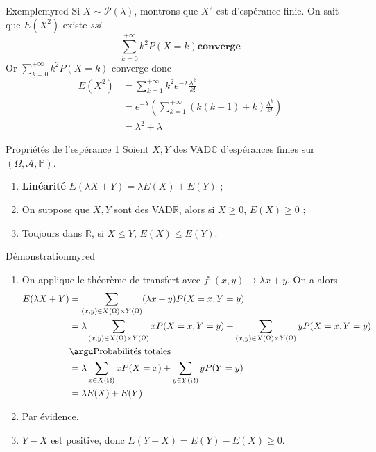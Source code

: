     \begin{omed}{Exemple}{myred}
        Si $X \sim \mathcal{P}(\lambda)$, montrons que $X^2$ est d’espérance finie. On sait que $E(X^2)$ existe \textit{ssi}
        \[ \sum_{k=0}^{+\infty} k^2 P(X = k) \textbf{converge}\]  
        Or $\sum_{k=0}^{+\infty} k^2 P(X = k)$ converge donc 
        \begin{align*}
            E(X^2) &= \sum_{k=1}^{+\infty} k^2 e^{-\lambda} \frac{\lambda^k}{k!} \\
            &= e^{-\lambda} \left(\sum_{k = 1}^{+\infty} (k(k-1) + k) \frac{\lambda^k}{k!}\right) \\
            &= \lambda^2 + \lambda
        \end{align*}
    \end{omed}

    \begin{theo}{Propriétés de l’espérance 1}{}
        Soient $X,Y$ des VAD$\mathbb{C}$ d’espérances finies sur $(\Omega, \mathcal{A}, \mathbb{P})$. 
        \begin{enumerate}
            \item \textbf{Linéarité} \quad $E(\lambda X + Y) = \lambda E(X) + E(Y)$ ;
            \item On suppose que $X,Y$ sont des VAD$\mathbb{R}$, alors si $X \geq 0$, $E(X) \geq 0$ ;
            \item Toujours dans $\mathbb{R}$, si $X \leq Y$, $E(X) \leq E(Y)$.
        \end{enumerate}
    \end{theo}

    \begin{demo}{Démonstration}{myred}
        \begin{enumerate}
            \item On applique le théorème de transfert avec $f : (x,y) \mapsto \lambda x + y$. On a alors 
            \begin{align*}
                E(\lambda X + Y) 
                &= \sum_{(x,y) \in X(\Omega) \times Y(\Omega)} (\lambda x + y) P(X = x, Y = y) \\
                &= \lambda \sum_{(x,y) \in X(\Omega) \times Y(\Omega)} x P(X=x,Y=y) + \sum_{(x,y) \in X(\Omega) \times Y(\Omega)} y P(X=x,Y=y) \\
                &\argu \text{Probabilités totales} \\
                &= \lambda \sum_{x \in X(\Omega)} x P(X=x) + \sum_{y \in Y(\Omega)} y P(Y=y) \\
                &= \lambda E(X) + E(Y) 
            \end{align*}
            \item Par évidence.
            \item $Y - X$ est positive, donc $E(Y-X) = E(Y ) - E(X) \geq 0$.
        \end{enumerate}
    \end{demo}

